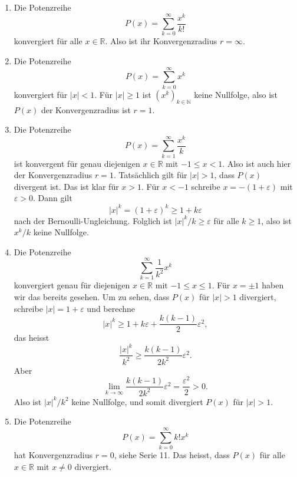 \documentclass[../main.tex]{subfiles}
\begin{document}
\begin{examples}
  \leavevmode
  \begin{enumerate}[(1)]
    \item Die Potenzreihe
      \[
        P(x) = \sum_{k=0}^{\infty} \frac{x^k}{k!}
      \]
      konvergiert für alle $x \in \mathbb{R}$. 
      Also ist ihr Konvergenzradius $r = \infty$.
    \item Die Potenzreihe
      \[
        P(x) = \sum_{k=0}^{\infty} x^k
      \]
      konvergiert für $|x| < 1$. Für $|x| \geq 1$ ist ${(x^{k})}_{k \in \mathbb{N}}$ keine
      Nullfolge, also ist $P(x)$ der Konvergenzradius ist  $r = 1$.
    \item Die Potenzreihe
      \[
        P(x) = \sum_{k=1}^{\infty} \frac{x^k}{k}
      \]
      ist konvergent für genau diejenigen $x \in \mathbb{R}$ mit $-1 \leq x < 1$.
      Also ist auch hier der Konvergenzradius $r = 1$.
      Tatsächlich gilt für $|x| > 1$, dass $P(x)$ divergent ist.
      Das ist klar für $x > 1$. Für $x < -1$ schreibe
      $x = -(1 + \varepsilon)$ mit $\varepsilon > 0$.
      Dann gilt 
      \[
        |x|^k = (1 + \varepsilon)^k \geq 1 + k \varepsilon
      \]
      nach der Bernoulli-Ungleichung. Folglich ist $|x|^k/k \geq \varepsilon$ 
      für alle $k \geq 1$, also ist $x^k/k$ keine Nullfolge.
    \item Die Potenzreihe
      \[
        \sum_{k=1}^{\infty} \frac{1}{k^2}x^k
      \]
      konvergiert genau für diejenigen $x \in \mathbb{R}$ mit $-1 \leq x \leq 1$.
      Für $x = \pm 1$ haben wir das bereits gesehen. Um zu sehen, dass
      $P(x)$ für $|x| > 1$ divergiert, schreibe
      \(
        |x| = 1 + \varepsilon
      \)
      und berechne
      \[
        |x|^k \geq 1 + k \varepsilon + \frac{k(k-1)}{2}\varepsilon^2,
      \]
      das heisst
      \[
        \frac{|x|^k}{k^2} \geq \frac{k(k-1)}{2k^2} \varepsilon^2.
      \]
      Aber
      \[
        \lim_{k \to \infty} \frac{k(k-1)}{2k^2}\varepsilon^2 = \frac{\varepsilon^2}{2} > 0.
      \]
      Also ist $|x|^k/k^2$ keine Nullfolge, und somit divergiert $P(x)$ für $|x| > 1$.
    \item Die Potenzreihe
      \[
        P(x) = \sum_{k=0}^{\infty} k! x^k
      \]
      hat Konvergenzradius $r = 0$, siehe Serie 11.
      Das heisst, dass $P(x)$ für alle $x \in \mathbb{R}$ mit $x \neq 0$ divergiert.
  \end{enumerate}
\end{examples}
\end{document}
